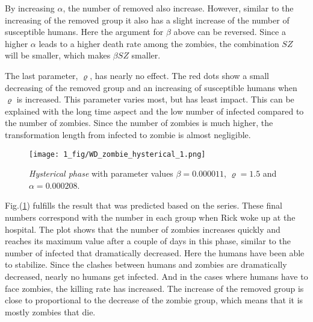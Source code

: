 \documentclass[%
twoside,                 %
final,                   %
chapterprefix=true,      %
open=right               %
10pt]{book}
\begin{document}
\vspace{3mm}




\vspace{3mm}


By increasing $\alpha$, the number of removed also increase. However, similar to the increasing of the removed group it also has a slight increase of the number of susceptible humans. Here the argument for $\beta$ above can be reversed. Since a higher $\alpha$ leads to a higher death rate among the zombies, the combination $SZ$ will be smaller, which makes $\beta SZ$ smaller.


\vspace{3mm}




\vspace{3mm}


The last parameter, $\varrho$, has nearly no effect. The red dots show a small decreasing of the removed group and  an increasing of susceptible humans when $\varrho$ is increased. This parameter varies most, but has least impact. This can be explained with the long time aspect and the low number of infected compared to the number of zombies. Since the number of zombies is much higher, the transformation length from infected to zombie is almost negligible.  


\begin{figure}[ht]
  \centerline{\texttt{[image: 1\_fig/WD\_zombie\_hysterical\_1.png]}}
  \caption{
  \label{fig:hysterical_1} \emph{Hysterical phase} with parameter values $\beta = 0.000011$, $\varrho = 1.5$ and $\alpha = 0.000208$.
  }
\end{figure}


Fig.(\ref{fig:hysterical_1}) fulfills the result that was predicted based on the series. These final numbers correspond with the number in each group when Rick woke up at the hospital. The plot shows that the number of zombies increases quickly and reaches its maximum value after a couple of days in this phase, similar to the number of infected that dramatically decreased. Here the humans have been able to stabilize. Since the clashes between humans and zombies are dramatically decreased, nearly no humans get infected. And in the cases where humans have to face zombies, the killing rate has increased. The increase of the removed group is close to proportional to the decrease of the zombie group, which means that it is mostly zombies that die.
\end{document}

